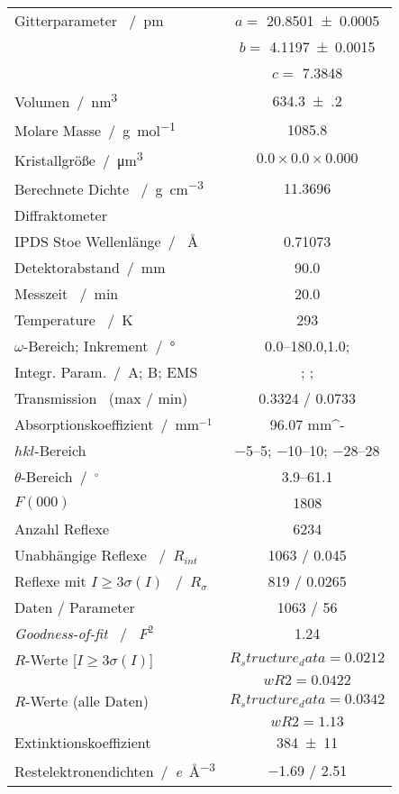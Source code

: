 \begin{tabular}{lc}
\toprule
Gitterparameter ~/~\si{\pico\meter} &   $a =$ \num{20.8501(5)}\\
   & $b =$ \num{4.1197(15)} \\
   & $c =$ \num{7.3848}\\  
Volumen~/~\si{\nano\meter\cubed} & \num{634.3(2)}\\
Molare Masse~/~\si{\gram\per\mole}	& \num{1085.8} \\
Kristallgröße~/~\si{\micro\meter\cubed} & $0.0 \times 0.0 \times 0.000 $ \\
Berechnete Dichte ~/~\si{\gram\per\centi\meter\cubed}	&\num{11.3696} \\
Diffraktometer & \\IPDS Stoe
Wellenlänge~/~ \si{\angstrom} 	&\num{0.71073} \\
Detektorabstand~/~\si{\milli\meter} & \num{90.0} \\
Messzeit ~/~\si{\minute} & \num{20.0} \\
Temperature ~/~\si{\kelvin} & \num{293} \\
$\omega$-Bereich; Inkrement~/~\si{\degree} &\numrange{0.0 }{ 180.0},\num{1.0};\\
Integr. Param.~/~A; B; EMS & \num{}; \num{}; \num{} \\
Transmission ~(max / min) & \num{ 0.3324} / \num{0.0733} \\
Absorptionskoeffizient~/~mm$^{-1}$	& \num{96.07 mm^-} \\
$hkl$-Bereich & \numrange{-5}{5}; \numrange{-10}{10}; \numrange{-28}{28}\\
$\theta$-Bereich~/~$^{\circ}$ &\numrange{3.9}{ 61.1}\\
$F(000)$ &\num{1808} \\
Anzahl Reflexe	&\num{6234} \\
Unabhängige Reflexe ~/~$R_{int}$ & \num{1063} / \num{0.045} \\
Reflexe mit $I \geq 3\sigma(I)$ ~/~$R_\sigma$ & \num{819} / \num{0.0265}\\
Daten / Parameter &\num{1063} / \num{56} \\
\textit{Goodness-of-fit} ~/~ $F^{2}$  & \num{1.24} \\
$R$-Werte [$I \geq 3\sigma(I)$] &$R_structure_data = \num{0.0212}$ \\
&$wR2 = \num{0.0422}$ \\
$R$-Werte (alle Daten) & $R_structure_data = \num{0.0342}$ \\
&$wR2 = \num{1.13}$ \\
Extinktionskoeffizient	& \num{384(11)} \\
Restelektronendichten~/~\si{\elementarycharge\per\cubic\angstrom} & \num{-1.69} / \num{2.51}\\
\bottomrule\end{tabular}